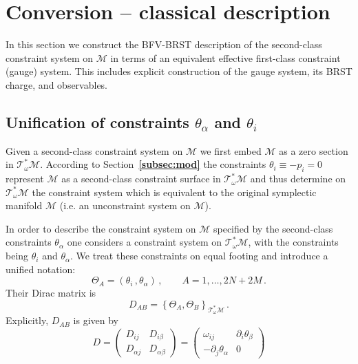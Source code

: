 \documentclass[a4paper,11pt]{amsart}
\numberwithin{thm}{section} %
\numberwithin{equation}{section} %
\numberwithin{figure}{section} %
\newcommand{\bref}[1]{{\bf \ref{#1}}}
\newcommand{\pb}[2]{\left\{{}#1{},{}#2{}\right\}}
\renewcommand{\:}{{\rm\, :\,}}
\def\d{\partial}
\def\mod{{\mathcal T}^*_\omega}
\def\manM{{\mathcal M}}
\begin{document}
\section{Conversion -- classical description}\label{sec:cl}
In this section we construct the BFV-BRST description of the
second-class constraint system on $\manM$ in terms
of an equivalent effective first-class constraint (gauge) system.
This includes explicit construction of the gauge system,
its BRST charge, and observables.


\subsection{Unification of constraints $\theta_\alpha$ and $\theta_i$}
Given a second-class constraint system on $\manM$ we first embed
$\manM$ as a zero section in $\mod\manM$.  According to
Section~\bref{subsec:mod} the constraints
$\theta_i\equiv -p_i=0$ represent $\manM$ as a second-class constraint
surface in $\mod\manM$ and thus determine on $\mod\manM$ the
constraint system which is equivalent to the original symplectic
manifold $\manM$ (i.e. an unconstraint system on $\manM$).

In order to describe the constraint system on $\manM$ specified by
the second-class constraints $\theta_\alpha$ one considers
a constraint system on $\mod\manM$, with the constraints being
$\theta_i$ and $\theta_\alpha$.  We treat these constraints on
equal footing and introduce a unified notation:
\begin{equation}
\Theta_A=(\theta_i\,,\theta_\alpha)\,,
 \qquad A=1,\ldots ,2N+2M\,.
\end{equation}
Their Dirac matrix is
\begin{equation}
  \label{eq:Dirac-Theta}
D_{AB}=\pb{\Theta_A}{\Theta_B}_{\mod\manM}\,.
\end{equation}
Explicitly, $D_{AB}$ is given by
\begin{equation}
D=
\left(\begin{array}{cc}
D_{ij} & D_{i\beta}\\[7pt]
D_{\alpha j}& D_{\alpha\beta}
 \end{array}\right)=
\left(\begin{array}{cc}
\omega_{ij} & \d_i \theta_\beta\\[7pt]
- \d_j\theta_\alpha & 0
 \end{array}\right)
\end{equation}

\medskip
\end{document}
